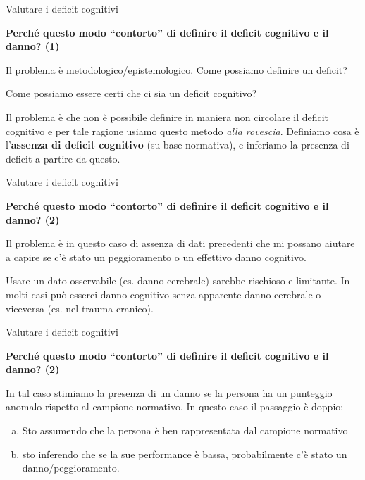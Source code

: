 \documentclass[
  ignorenonframetext,
]{beamer}
\begin{document}
\begin{frame}{Valutare i deficit cognitivi}
\label{valutare-i-deficit-cognitivi-27}
\begin{center}
  \textbf{Perché questo modo “contorto” di definire il deficit cognitivo e il danno? (1)}
\end{center}
\vspace{2em}

Il problema è metodologico/epistemologico. Come possiamo definire un
deficit?

Come possiamo essere certi che ci sia un deficit cognitivo?

Il problema è che non è possibile definire in maniera non circolare il
deficit cognitivo e per tale ragione usiamo questo metodo \emph{alla
rovescia}. Definiamo cosa è l'\textbf{assenza di deficit cognitivo} (su
base normativa), e inferiamo la presenza di deficit a partire da questo.
\end{frame}

\begin{frame}{Valutare i deficit cognitivi}
\label{valutare-i-deficit-cognitivi-28}
\begin{center}
  \textbf{Perché questo modo “contorto” di definire il deficit cognitivo e il danno? (2)}
\end{center}
\vspace{2em}

Il problema è in questo caso di assenza di dati precedenti che mi
possano aiutare a capire se c'è stato un peggioramento o un effettivo
danno cognitivo.

Usare un dato osservabile (es. danno cerebrale) sarebbe rischioso e
limitante. In molti casi può esserci danno cognitivo senza apparente
danno cerebrale o viceversa (es. nel trauma cranico).
\end{frame}

\begin{frame}{Valutare i deficit cognitivi}
\label{valutare-i-deficit-cognitivi-29}
\begin{center}
  \textbf{Perché questo modo “contorto” di definire il deficit cognitivo e il danno? (2)}
\end{center}
\vspace{2em}

In tal caso stimiamo la presenza di un danno se la persona ha un
punteggio anomalo rispetto al campione normativo. In questo caso il
passaggio è doppio:

\begin{enumerate}
[a)]
\item
  Sto assumendo che la persona è ben rappresentata dal campione
  normativo
\item
  sto inferendo che se la sue performance è bassa, probabilmente c'è
  stato un danno/peggioramento.
\end{enumerate}
\end{frame}
\end{document}
